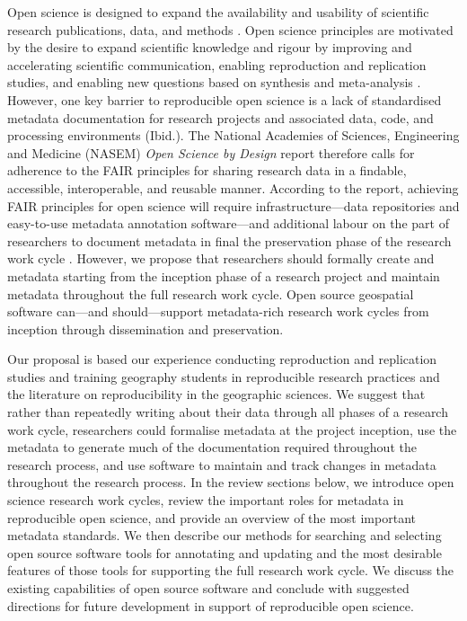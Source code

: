 \documentclass{isprs} %
\begin{document}
Open science is designed to expand the availability and usability of scientific research publications, data, and methods \citep{NASEM2018}.
Open science principles are motivated by the desire to expand scientific knowledge and rigour by improving and accelerating scientific communication, enabling reproduction and replication studies, and enabling new questions based on synthesis and meta-analysis \citep{NASEM2018,NASEM2019}. 
However, one key barrier to reproducible open science is a lack of standardised metadata documentation for research projects and associated data, code, and processing environments (Ibid.).
The National Academies of Sciences, Engineering and Medicine (NASEM) \textit{Open Science by Design} \citeyear{NASEM2018} report therefore calls for adherence to the FAIR principles \citep{Wilkinson2016} for sharing research data in a findable, accessible, interoperable, and reusable manner.
According to the report, achieving FAIR principles for open science will require infrastructure---data repositories and easy-to-use metadata annotation software---and additional labour on the part of researchers to document metadata in final the preservation phase of the research work cycle \citep{NASEM2018}. 
However, we propose that researchers should formally create and metadata starting from the inception phase of a research project and maintain metadata throughout the full research work cycle.
Open source geospatial software can---and should---support metadata-rich research work cycles from inception through dissemination and preservation.

Our proposal is based our experience conducting reproduction and replication studies and training geography students in reproducible research practices \citep{Kedron_Holler_Bardin_Hilgendorf_2022} and the literature on reproducibility in the geographic sciences.
We suggest that rather than repeatedly writing about their data through all phases of a research work cycle, researchers could formalise metadata at the project inception, use the metadata to generate much of the documentation required throughout the research process, and use software to maintain and track changes in metadata throughout the research process.
In the review sections below, we introduce open science research work cycles, review the important roles for metadata in reproducible open science, and provide an overview of the most important metadata standards.
We then describe our methods for searching and selecting open source software tools for annotating and updating and the most desirable features of those tools for supporting the full research work cycle.
We discuss the existing capabilities of open source software and conclude with suggested directions for future development in support of reproducible open science.
\end{document}
